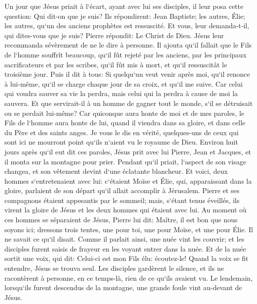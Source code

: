 \verse Un jour que Jésus priait à l`écart, ayant avec lui ses disciples, il leur posa cette question: Qui dit-on que je suis? 
\verse Ils répondirent: Jean Baptiste; les autres, Élie; les autres, qu`un des anciens prophètes est ressuscité. 
\verse Et vous, leur demanda-t-il, qui dites-vous que je suis? Pierre répondit: Le Christ de Dieu. 
\verse Jésus leur recommanda sévèrement de ne le dire à personne. 
\verse Il ajouta qu`il fallait que le Fils de l`homme souffrît beaucoup, qu`il fût rejeté par les anciens, par les principaux sacrificateurs et par les scribes, qu`il fût mis à mort, et qu`il ressuscitât le troisième jour. 
\verse Puis il dit à tous: Si quelqu`un veut venir après moi, qu`il renonce à lui-même, qu`il se charge chaque jour de sa croix, et qu`il me suive. 
\verse Car celui qui voudra sauver sa vie la perdra, mais celui qui la perdra à cause de moi la sauvera. 
\verse Et que servirait-il à un homme de gagner tout le monde, s`il se détruisait ou se perdait lui-même? 
\verse Car quiconque aura honte de moi et de mes paroles, le Fils de l`homme aura honte de lui, quand il viendra dans sa gloire, et dans celle du Père et des saints anges. 
\verse Je vous le dis en vérité, quelques-uns de ceux qui sont ici ne mourront point qu`ils n`aient vu le royaume de Dieu. 
\verse Environ huit jours après qu`il eut dit ces paroles, Jésus prit avec lui Pierre, Jean et Jacques, et il monta sur la montagne pour prier. 
\verse Pendant qu`il priait, l`aspect de son visage changea, et son vêtement devint d`une éclatante blancheur. 
\verse Et voici, deux hommes s`entretenaient avec lui: c`étaient Moïse et Élie, 
\verse qui, apparaissant dans la gloire, parlaient de son départ qu`il allait accomplir à Jérusalem. 
\verse Pierre et ses compagnons étaient appesantis par le sommeil; mais, s`étant tenus éveillés, ils virent la gloire de Jésus et les deux hommes qui étaient avec lui. 
\verse Au moment où ces hommes se séparaient de Jésus, Pierre lui dit: Maître, il est bon que nous soyons ici; dressons trois tentes, une pour toi, une pour Moïse, et une pour Élie. Il ne savait ce qu`il disait. 
\verse Comme il parlait ainsi, une nuée vint les couvrir; et les disciples furent saisis de frayeur en les voyant entrer dans la nuée. 
\verse Et de la nuée sortit une voix, qui dit: Celui-ci est mon Fils élu: écoutez-le! 
\verse Quand la voix se fit entendre, Jésus se trouva seul. Les disciples gardèrent le silence, et ils ne racontèrent à personne, en ce temps-là, rien de ce qu`ils avaient vu. 
\verse Le lendemain, lorsqu`ils furent descendus de la montagne, une grande foule vint au-devant de Jésus. 

